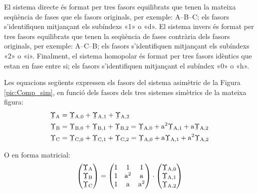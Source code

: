 \begin{center}
    
    \label{pic:Comp_sim}
\end{center}

 
 El sistema directe és format per tres
fasors equilibrats que tenen la mateixa seqüència de fases que els fasors
originals, per exemple: A--B--C; els fasors
s'identifiquen mitjançant els subíndexs «1» o «d». El sistema
invers és format per tres fasors equilibrats que tenen la seqüència de fases contrària
 dels fasors originals, per exemple: A--C--B; els fasors s'identifiquen mitjançant els
subíndexs «2» o «i». Finalment, el sistema homopolar és
format per tres fasors idèntics que estan en fase entre si; els fasors 
s'identifiquen mitjançant el subíndex «0» o «h».

Les equacions següents expressen els fasors del sistema asimètric de la Figura \vref{pic:Comp_sim}, en funció
dels fasors dels tres sistemes simètrics de la mateixa figura:
\begin{subequations}
\begin{align}
   \cmplx{\Upsilon}\ped{A} &= \cmplx{\Upsilon}\ped{A,0}  +
   \cmplx{\Upsilon}\ped{A,1} + \cmplx{\Upsilon}\ped{A,2} \label{eq:c_sim_a}\\
   \cmplx{\Upsilon}\ped{B} &= \cmplx{\Upsilon}\ped{B,0} + \cmplx{\Upsilon}\ped{B,1} +
   \cmplx{\Upsilon}\ped{B,2}  =  \cmplx{\Upsilon}\ped{A,0} + \au^2
   \cmplx{\Upsilon}\ped{A,1} + \au \cmplx{\Upsilon}\ped{A,2} \label{eq:c_sim_b}\\
   \cmplx{\Upsilon}\ped{C} &= \cmplx{\Upsilon}\ped{C,0} + \cmplx{\Upsilon}\ped{C,1} +
   \cmplx{\Upsilon}\ped{C,2}  = \cmplx{\Upsilon}\ped{A,0} + \au
   \cmplx{\Upsilon}\ped{A,1} + \au^2 \cmplx{\Upsilon}\ped{A,2} \label{eq:c_sim_c}
\end{align}
\end{subequations}

O en forma matricial:
\begin{equation}\label{eq:c_sim_mat}
   \begin{pmatrix}
     \cmplx{\Upsilon}\ped{A} \\
     \cmplx{\Upsilon}\ped{B} \\
     \cmplx{\Upsilon}\ped{C}
   \end{pmatrix} =
   \begin{pmatrix}
     1 & 1 & 1 \\
     1 & \au^2 & \au\\
     1 & \au & \au^2
   \end{pmatrix} \cdot
   \begin{pmatrix}
     \cmplx{\Upsilon}\ped{A,0} \\
     \cmplx{\Upsilon}\ped{A,1} \\
     \cmplx{\Upsilon}\ped{A,2}
   \end{pmatrix}
\end{equation}

